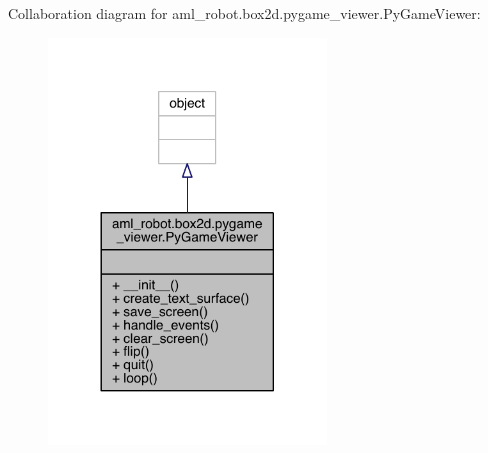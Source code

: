 Collaboration diagram for aml\+\_\+robot.\+box2d.\+pygame\+\_\+viewer.\+Py\+Game\+Viewer\+:
\nopagebreak
\begin{figure}[H]
\begin{center}
\leavevmode
\includegraphics[width=209pt]{classaml__robot_1_1box2d_1_1pygame__viewer_1_1_py_game_viewer__coll__graph}
\end{center}
\end{figure}
